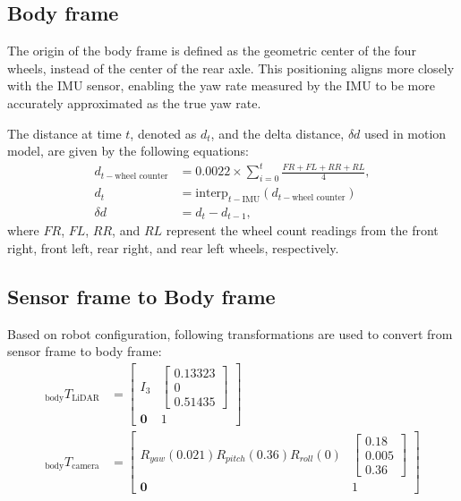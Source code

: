\documentclass[conference]{IEEEtran}
\begin{document}
\subsection{Body frame}
The origin of the body frame is defined as the geometric center of the four wheels, 
instead of the center of the rear axle. 
This positioning aligns more closely with the IMU sensor, 
enabling the yaw rate measured by the IMU to be more accurately approximated as 
the true yaw rate.

The distance at time \(t\), denoted as \(d_t\), 
and the delta distance, \(\delta d\) used in motion model, 
are given by the following equations:
$$
\begin{aligned}
d_{t-\text{wheel counter}} &= 0.0022 \times \sum_{i=0}^{t} \frac{FR + FL + RR + RL}{4}, \\
d_{t} &= \text{interp}_{t-\text{IMU}}(d_{t-\text{wheel counter}})\\
\delta d &= d_{t} - d_{t-1},
\end{aligned}
$$
where $FR$, $FL$, $RR$, and $RL$ represent the wheel count readings 
from the front right, front left, rear right, and rear left wheels, respectively.

\subsection{Sensor frame to Body frame}
Based on robot configuration, following transformations are used to convert 
from sensor frame to body frame:
$$
\begin{aligned}
    {}_{\text{body} }T_{\text{LiDAR} }
        &=\left[ \begin{matrix}I_{3}&\left[ \begin{gathered}0.13323\\ 0\\ 0.51435\end{gathered} \right]  \\ \mathbf{0}&1\end{matrix} \right]  \\ 
    {}_{\text{body} }T_{\text{camera} }
        &=\left[ \begin{matrix}R_{yaw}\left( 0.021\right)  R_{pitch}\left( 0.36\right)  R_{roll}\left( 0\right)  &\left[ \begin{gathered}0.18\\ 0.005\\ 0.36\end{gathered} \right]  \\ \mathbf{0}&1\end{matrix} \right]  
\end{aligned} 
$$
\end{document}

